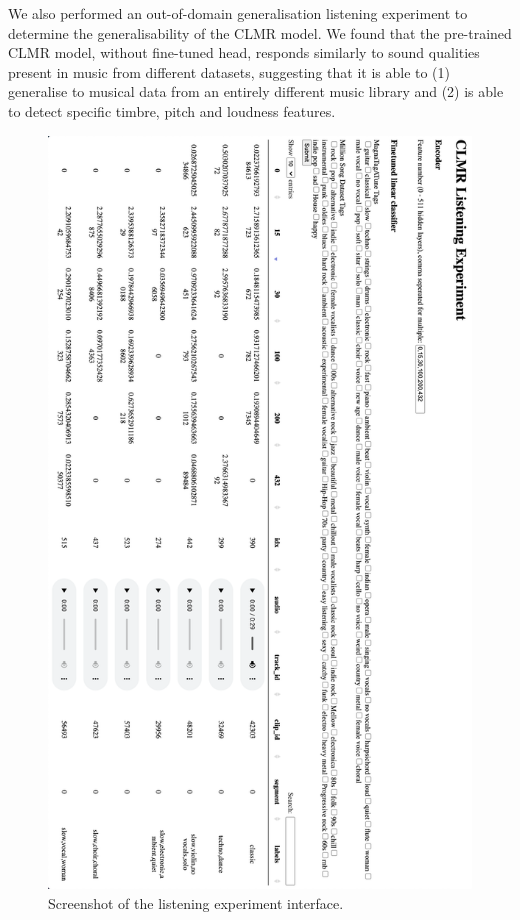 We also performed an out-of-domain generalisation listening experiment to determine the generalisability of the CLMR model. We found that the pre-trained CLMR model, without fine-tuned head, responds similarly to sound qualities present in music from different datasets, suggesting that it is able to (1) generalise to musical data from an entirely different music library and (2) is able to detect specific timbre, pitch and loudness features.

\newpage

\begin{figure}[h]
    \centering
    \includegraphics[width=\textwidth]{figs/listening_experiment.png}
    \caption{Screenshot of the listening experiment interface.}
    \label{fig:listening_experiment}
\end{figure}


